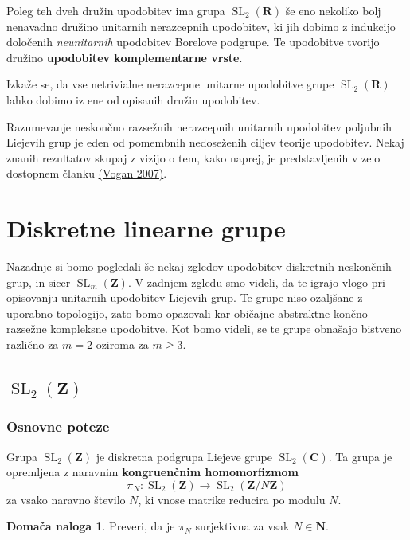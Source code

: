 \documentclass[11pt]{book}
\def\NN{\mathbf{N}}
\def\ZZ{\mathbf{Z}}
\def\RR{\mathbf{R}}
\def\CC{\mathbf{C}}
\DeclareMathOperator\SL{SL}
\def\definicija{\color{rdeca}\bf}
\theoremstyle{definition}
\theoremstyle{zgled}
\theoremstyle{zgledbrezstevilke}
\theoremstyle{odprtproblem}
\theoremstyle{domacanaloga}
\newtheorem{domacanaloga}[theorem]{Domača naloga}
\theoremstyle{izrek}
\begin{document}
Poleg teh dveh družin upodobitev ima grupa $\SL_2(\RR)$ še eno nekoliko bolj nenavadno družino unitarnih nerazcepnih upodobitev, ki jih dobimo z indukcijo določenih \emph{neunitarnih} upodobitev Borelove podgrupe. Te upodobitve tvorijo družino {\definicija upodobitev komplementarne vrste}.

Izkaže se, da vse netrivialne nerazcepne unitarne upodobitve grupe $\SL_2(\RR)$ lahko dobimo iz ene od opisanih družin upodobitev.

Razumevanje neskončno razsežnih nerazcepnih unitarnih upodobitev poljubnih Liejevih grup je eden od pomembnih nedoseženih ciljev teorije upodobitev. Nekaj znanih rezultatov skupaj z vizijo o tem, kako naprej, je predstavljenih v zelo dostopnem članku \href{https://math.mit.edu/~dav/articleHIST.pdf}{(Vogan 2007)}.


\section{Diskretne linearne grupe}

Nazadnje si bomo pogledali še nekaj zgledov upodobitev diskretnih neskončnih grup, in sicer $\SL_m(\ZZ)$. V zadnjem zgledu smo videli, da te igrajo vlogo pri opisovanju unitarnih upodobitev Liejevih grup. Te grupe niso ozaljšane z uporabno topologijo, zato bomo opazovali kar običajne abstraktne končno razsežne kompleksne upodobitve. Kot bomo videli, se te grupe obnašajo bistveno različno za $m = 2$ oziroma za $m \geq 3$.

\subsection{$\SL_2(\ZZ)$}

\subsubsection{Osnovne poteze}

Grupa $\SL_2(\ZZ)$ je diskretna podgrupa Liejeve grupe $\SL_2(\CC)$. Ta grupa je opremljena z naravnim {\definicija kongruenčnim homomorfizmom}
\[
    \textstyle \pi_N \colon \SL_2(\ZZ) \to \SL_2(\ZZ/N\ZZ)
\]
za vsako naravno število $N$, ki vnose matrike reducira po modulu $N$. 

\begin{domacanaloga}
Preveri, da je $\pi_N$ surjektivna za vsak $N \in \NN$.
\end{domacanaloga}
\end{document}
